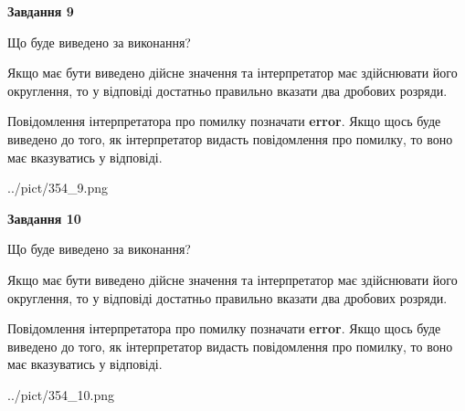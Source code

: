 \documentclass[12pt, ukrainian]{article}
\begin{document}
{\begin {Large}
{\begin {center}\textbf{Завдання 9}\end {center}}\par
Що буде виведено за виконання? \par

Якщо має бути виведено дійсне значення та інтерпретатор має здійснювати його округлення, 
то у відповіді достатньо правильно вказати два дробових розряди.

Повідомлення інтерпретатора про помилку позначати \textbf{error}.
Якщо щось буде виведено до того, як інтерпретатор видасть повідомлення про помилку, 
то воно має вказуватись у відповіді. \par

\begin{center}
	{../pict/354_9.png}
\end{center}
\newpage

{\begin {center}\textbf{Завдання 10}\end {center}}\par
Що буде виведено за виконання? \par

Якщо має бути виведено дійсне значення та інтерпретатор має здійснювати його округлення, 
то у відповіді достатньо правильно вказати два дробових розряди.

Повідомлення інтерпретатора про помилку позначати \textbf{error}.
Якщо щось буде виведено до того, як інтерпретатор видасть повідомлення про помилку, 
то воно має вказуватись у відповіді. \par

\begin{center}
	{../pict/354_10.png}
\end{center}
\newpage

\end {Large}}
\end{document}

